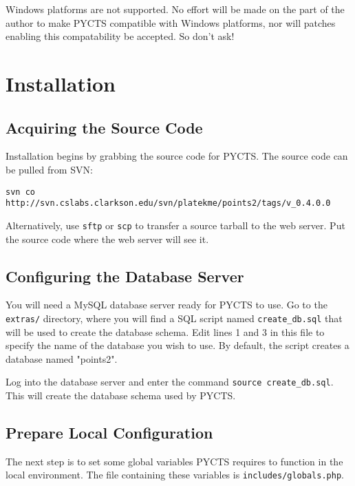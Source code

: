 \documentclass[letterpaper,titlepage]{article}
\newcommand{\softwareversion}{0.4.0.0}
\begin{document}
Windows platforms are not supported. No effort will be made on the part of the author to make PYCTS compatible with Windows platforms, nor will patches enabling this compatability be accepted. So don't ask!

\newpage
\section{Installation}
\subsection{Acquiring the Source Code}
Installation begins by grabbing the source code for PYCTS. The source code can be pulled from SVN:

{\tt svn co http://svn.cslabs.clarkson.edu/svn/platekme/points2/tags/v\_\softwareversion }

Alternatively, use {\tt sftp} or {\tt scp} to transfer a source tarball to the web server. Put the source code where the web server will see it.

\subsection{Configuring the Database Server}
You will need a MySQL database server ready for PYCTS to use. Go to the {\tt extras/} directory, where you will find a SQL script named {\tt create\_db.sql} that will be used to create the database schema. Edit lines 1 and {3} in this file to specify the name of the database you wish to use. By default, the script creates a database named "points2".

Log into the database server and enter the command {\tt source create\_db.sql}. This will create the database schema used by PYCTS.

\subsection{Prepare Local Configuration}
The next step is to set some global variables PYCTS requires to function in the local environment. The file containing these variables is {\tt includes/globals.php}.
\end{document}
